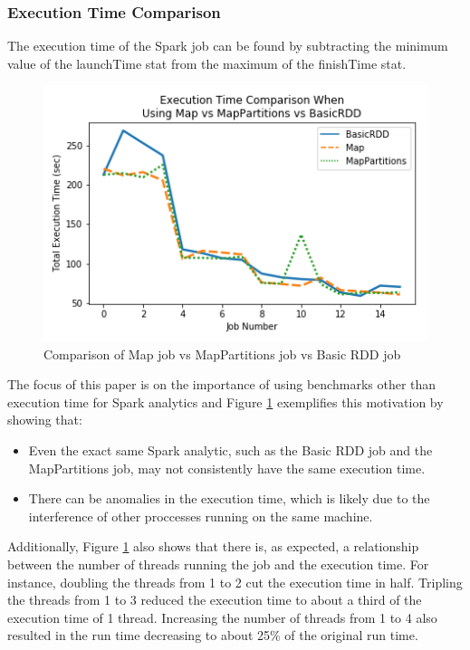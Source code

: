 \documentclass[conference]{IEEEtran}
\begin{document}
\subsubsection{Execution Time Comparison}
The execution time of the Spark job can be found by subtracting the minimum value of the launchTime stat from the maximum of the finishTime stat.

\begin{figure}
    \includegraphics[width=\linewidth]{../python_scripts/images/mapVsMapPartitionsAllExecutionTime.png}
    \caption{Comparison of Map job vs MapPartitions job vs Basic RDD job}
    \label{fig:mapVMapPartitionsAllExecTime}
\end{figure}

The focus of this paper is on the importance of using benchmarks other than execution time for Spark analytics and Figure \ref{fig:mapVMapPartitionsAllExecTime} exemplifies this motivation by showing that:
\begin{itemize}
\item Even the exact same Spark analytic, such as the Basic RDD job and the MapPartitions job, may not consistently have the same execution time.
\item There can be anomalies in the execution time, which is likely due to the interference of other proccesses running on the same machine.
\end{itemize}

Additionally, Figure \ref{fig:mapVMapPartitionsAllExecTime} also shows that there is, as expected, a relationship between the number of threads running the job and the execution time.
For instance, doubling the threads from 1 to 2 cut the execution time in half.
Tripling the threads from 1 to 3 reduced the execution time to about a third of the execution time of 1 thread.
Increasing the number of threads from 1 to 4 also resulted in the run time decreasing to about 25\% of the original run time.
\end{document}
